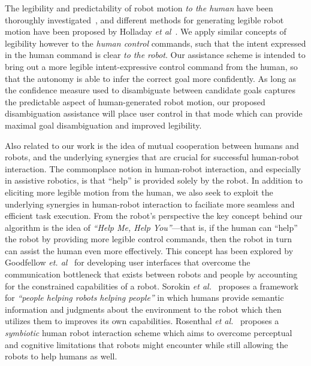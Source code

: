 \documentclass[conference]{IEEEtran}
\begin{document}
The legibility and predictability of robot motion \textit{to the human} have been thoroughly investigated~\cite{dragan2013legibility}, and different methods for generating legible robot motion have been proposed by Holladay \textit{et al}~\cite{holladay2014legible}. We apply similar concepts of legibility however to the \textit{human control} commands, such that the intent expressed in the human command is clear \textit{to the robot}. Our assistance scheme is intended to bring out a more legible intent-expressive control command from the human, so that the autonomy is able to infer the correct goal more confidently. 
As long as the confidence measure used to disambiguate between candidate goals captures the predictable aspect of human-generated robot motion, our proposed disambiguation assistance will place user control in that mode which can provide maximal goal disambiguation and improved legibility.

Also related to our work is the idea of mutual cooperation between humans and robots, and the underlying synergies that are crucial for successful human-robot interaction. The commonplace notion in human-robot interaction, and especially in assistive robotics, is that ``help'' is provided solely by the robot. In addition to eliciting more legible motion from the human, we also seek to exploit the underlying synergies in human-robot interaction to faciliate more seamless and efficient task execution. From the robot's perspective the key concept behind our algorithm is the idea of \textit{``Help Me, Help You''}---that is, if the human can ``help'' the robot by providing more legible control commands, then the robot in turn can assist the human even more effectively. This concept has been explored by Goodfellow \textit{et. al}~\cite{goodfellow2010help} for developing user interfaces that overcome the communication bottleneck that exists between robots and people by accounting for the constrained capabilities of a robot. Sorokin \textit{et al.}~\cite{sorokin2010people} proposes a framework for \textit{``people helping robots helping people''} in which humans provide semantic information and judgments about the environment to the robot which then utilizes them to improves its own capabilities.  Rosenthal \textit{et al.}~\cite{rosenthal2010effective} proposes a \textit{symbiotic} human robot interaction scheme which aims to overcome perceptual and cognitive limitations that robots might encounter while still allowing the robots to help humans as well. 
\end{document}
